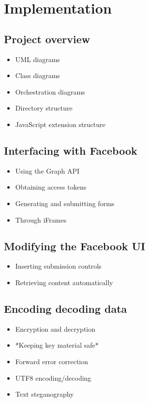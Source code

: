 \chapter{Implementation}\label{ch:implementation}

\section{Project overview}
    \begin{itemize}
        \item UML diagrams
        \item Class diagrams
        \item Orchestration diagrams
        \item Directory structure
        \item JavaScript extension structure
    \end{itemize}

\section{Interfacing with Facebook}
    \begin{itemize}
        \item Using the Graph API
        \item Obtaining access tokens
        \item Generating and submitting forms
        \item Through iFrames
    \end{itemize}

\section{Modifying the Facebook UI}
    \begin{itemize}
        \item Inserting submission controls
        \item Retrieving content automatically
    \end{itemize}

\section{Encoding decoding data}
    \begin{itemize}
        \item Encryption and decryption
        \item *Keeping key material safe*
        \item Forward error correction
        \item UTF8 encoding/decoding
        \item Text steganography
    \end{itemize}

